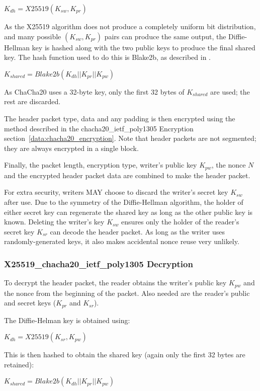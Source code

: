 \documentclass[10pt]{article}
\begin{document}
$K_{dh} = X25519(K_{sw}, K_{pr})$

As the X25519 algorithm does not produce a completely uniform bit distribution,
and many possible $(K_{sw}, K_{pr})$ pairs can produce the same output,
the Diffie-Hellman key is hashed along with the two public keys to produce the final shared key.
The hash function used to do this is Blake2b, as described in \cite{RFC7693}.

$K_{shared} = Blake2b(K_{dh} || K_{pr} || K_{pw})$

As ChaCha20 uses a 32-byte key, only the first 32 bytes of $K_{shared}$ are used; the rest are discarded.

The header packet type, data and any padding is then encrypted using the method described in the
chacha20\_ietf\_poly1305 Encryption section~\ref{data:chacha20_encryption}.
Note that header packets are not segmented; they are always encrypted in a single block.

Finally, the packet length, encryption type, writer's public key $K_{pw}$,
the nonce $N$ and the encrypted header packet data are combined to make the header packet.

For extra security, writers MAY choose to discard the writer's secret key $K_{sw}$ after use.
Due to the symmetry of the Diffie-Hellman algorithm, the holder of either secret key can regenerate the shared
key as long as the other public key is known.
Deleting the writer's key $K_{sw}$ ensures only the holder of the reader's secret key $K_{sr}$ can decode the header
packet.
As long as the writer uses randomly-generated keys, it also makes accidental nonce reuse very unlikely.

\subsubsection{X25519\_chacha20\_ietf\_poly1305 Decryption}

To decrypt the header packet, the reader obtains the writer's public key $K_{pw}$ and the nonce from the beginning
of the packet.
Also needed are the reader's public and secret keys ($K_{pr}$ and $K_{sr}$).

The Diffie-Helman key is obtained using:

$K_{dh} = X25519(K_{sr}, K_{pw})$

This is then hashed to obtain the shared key (again only the first 32 bytes are retained):

$K_{shared} = Blake2b(K_{dh} || K_{pr} || K_{pw})$
\end{document}

